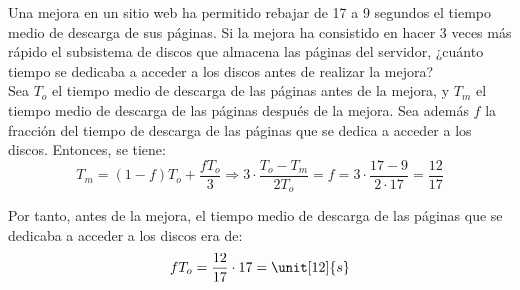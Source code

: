 \begin{ejercicio}
Una mejora en un sitio web ha permitido rebajar de 17 a 9 segundos el tiempo medio de descarga de sus páginas. Si la mejora ha consistido en hacer 3 veces más rápido el subsistema de discos que almacena las páginas del servidor, ¿cuánto tiempo se dedicaba a acceder a los discos antes de realizar la mejora?\\

Sea $T_o$ el tiempo medio de descarga de las páginas antes de la mejora, y $T_m$ el tiempo medio de descarga de las páginas después de la mejora. Sea además $f$ la fracción del tiempo de descarga de las páginas que se dedica a acceder a los discos. Entonces, se tiene:
\begin{equation*}
    T_m = (1-f)T_o + \dfrac{fT_o}{3}\Longrightarrow
    3\cdot \dfrac{T_o-T_m}{2T_o} = f = 3\cdot \dfrac{17-9}{2\cdot 17} = \dfrac{12}{17}
\end{equation*}

Por tanto, antes de la mejora, el tiempo medio de descarga de las páginas que se dedicaba a acceder a los discos era de:
\begin{equation*}
    fT_o = \dfrac{12}{17}\cdot 17 = \unit[12]{s}
\end{equation*}
\end{ejercicio}
\begin{comment}
SOLUCIÓN: De los 17 segundos del tiempo de respuesta del sistema antes de la mejora, 12 se empleaban en el acceso a los discos.
\end{comment}

